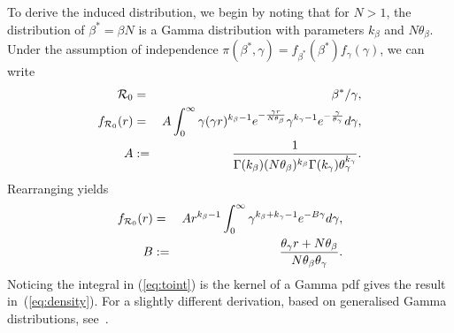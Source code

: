 \documentclass[alpha-refs]{wiley-article}
\newcommand{\rr}{ {\cal R}_0 }						%
\begin{document}
To derive the induced distribution, we begin by noting that for $N > 1$, the distribution of $\beta^{\ast} = \beta N$ is a Gamma distribution with parameters $k_{\beta}$ and $N\theta_{\beta}$.
Under the assumption of independence $\pi(\beta^{\ast}, \gamma) = f_{\beta^\ast}(\beta^{\ast})f_{\gamma}(\gamma)$, we can write
\begin{eqnarray}
\rr &=& \beta^{\ast}/\gamma,\\
f_{\rr}(r) &=& A \int_{0}^{\infty} \gamma(\gamma r)^{k_{\beta} -1} e^{-\frac{\gamma r}{N\theta_{\beta}}} \gamma^{k_{\gamma} -1} e^{-\frac{\gamma}{\theta_{\gamma}}} d\gamma, \\
\nonumber
A &:=& \frac{1}{\Gamma(k_{\beta})(N\theta_{\beta})^{k_{\beta}}\Gamma(k_{\gamma})\theta_{\gamma}^{k_{\gamma}}}.
\end{eqnarray}
Rearranging yields
\begin{eqnarray}
\label{eq:toint}
f_{\rr}(r) &=& A  r^{k_{\beta} -1} \int_{0}^{\infty} \gamma^{k_{\beta} + k_{\gamma} -1} e^{-B\gamma} d\gamma, \\
\nonumber
        B  &:=& \frac{\theta_{\gamma} r + N\theta_{\beta}}{N\theta_{\beta}\theta_{\gamma}}.
\end{eqnarray}
Noticing the integral in (\ref{eq:toint}) is the kernel of a Gamma pdf gives the result in~(\ref{eq:density}).
For a slightly different derivation, based on generalised Gamma distributions, see~\cite{Coelho2007}.



\end{document}
